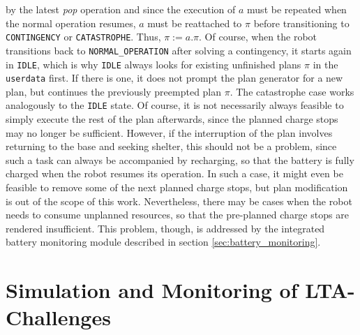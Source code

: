 \documentclass[english, master, utf8]{base/thesis_KBS}
\newcommand{\code}[1]{\colorbox{light-gray}{\texttt{#1}}}
\begin{document}
by the latest \textit{pop} operation and since the execution of $a$ must be repeated when the normal operation resumes, $a$ must be reattached to $\pi$ before transitioning
to \code{CONTINGENCY} or \code{CATASTROPHE}. Thus, $\pi := a.\pi$.
Of course, when the robot transitions back to \code{NORMAL\_OPERATION} after solving a contingency, it starts again in \code{IDLE}, which is why \code{IDLE}
always looks for existing unfinished plans $\pi$ in the \code{userdata} first. If there is one, it does not prompt the plan generator for a new plan, but continues the previously
preempted plan $\pi$. The catastrophe case works analogously to the \code{IDLE} state.\newline
Of course, it is not necessarily always feasible to simply execute the rest of the plan afterwards, since the planned charge stops may no longer be sufficient. However, if the
interruption of the plan involves returning to the base and seeking shelter, this should not be a problem, since such a task can always be accompanied by recharging, so that the
battery is fully charged when the robot resumes its operation. In such a case, it might even be feasible to remove some of the next planned charge stops, but plan modification is out
of the scope of this work. Nevertheless, there may be cases when the robot needs to consume unplanned resources, so that the pre-planned charge stops are rendered insufficient.
This problem, though, is addressed by the integrated battery monitoring module described in  section \ref{sec:battery_monitoring}.

\section{Simulation and Monitoring of LTA-Challenges}
\label{sec:sim_and_mon_of_lta_challenges}
\end{document}

